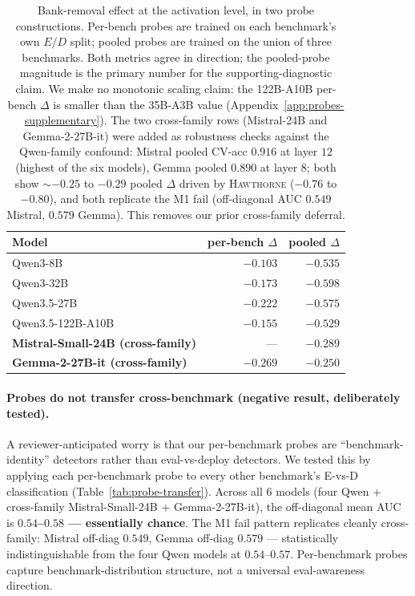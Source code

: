 \documentclass[11pt]{article}
\newcommand{\bench}[1]{\textsc{#1}}
\begin{document}
\begin{table}[t]
\centering\small
\setlength{\tabcolsep}{3pt}
\begin{tabular}{lrr}
\toprule
Model & per-bench $\Delta$ & pooled $\Delta$ \\
\midrule
Qwen3-8B               & $-0.103$ & $\bm{-0.535}$ \\
Qwen3-32B              & $-0.173$ & $\bm{-0.598}$ \\
Qwen3.5-27B            & $-0.222$ & $\bm{-0.575}$ \\
Qwen3.5-122B-A10B      & $-0.155$ & $\bm{-0.529}$ \\
\midrule
\textbf{Mistral-Small-24B (cross-family)} & --- & $\bm{-0.289}$ \\
\textbf{Gemma-2-27B-it (cross-family)}    & $-0.269$ & $\bm{-0.250}$ \\
\bottomrule
\end{tabular}
\caption{Bank-removal effect at the activation level, in two probe
constructions. Per-bench probes are trained on each benchmark's own
$E/D$ split; pooled probes are trained on the union of three benchmarks.
Both metrics agree in direction; the pooled-probe magnitude is the
primary number for the supporting-diagnostic claim. We make no monotonic
scaling claim: the 122B-A10B per-bench $\Delta$ is smaller than the
35B-A3B value (Appendix~\ref{app:probes-supplementary}). The two
cross-family rows (Mistral-24B and Gemma-2-27B-it) were added as
robustness checks against the Qwen-family confound: Mistral pooled
CV-acc $0.916$ at layer $12$ (highest of the six models), Gemma pooled
$0.890$ at layer $8$; both show $\sim$$-0.25$ to $-0.29$ pooled $\Delta$
driven by \bench{Hawthorne} ($-0.76$ to $-0.80$), and both replicate the
M1 fail (off-diagonal AUC $0.549$ Mistral, $0.579$ Gemma). This removes
our prior cross-family deferral.}
\label{tab:probe-deltas}
\end{table}

\paragraph{Probes do not transfer cross-benchmark (negative result,
deliberately tested).}
A reviewer-anticipated worry is that our per-benchmark probes are
``benchmark-identity'' detectors rather than eval-vs-deploy detectors.
We tested this by applying each per-benchmark probe to every other
benchmark's E-vs-D classification (Table~\ref{tab:probe-transfer}).
Across all 6 models (four Qwen + cross-family Mistral-Small-24B + Gemma-2-27B-it),
the off-diagonal mean AUC is \textbf{$0.54$--$0.58$ --- essentially chance}.
The M1 fail pattern replicates cleanly cross-family: Mistral off-diag $0.549$,
Gemma off-diag $0.579$ --- statistically indistinguishable from the four Qwen
models at $0.54$--$0.57$. Per-benchmark probes capture benchmark-distribution
structure, not a universal eval-awareness direction.
\end{document}
